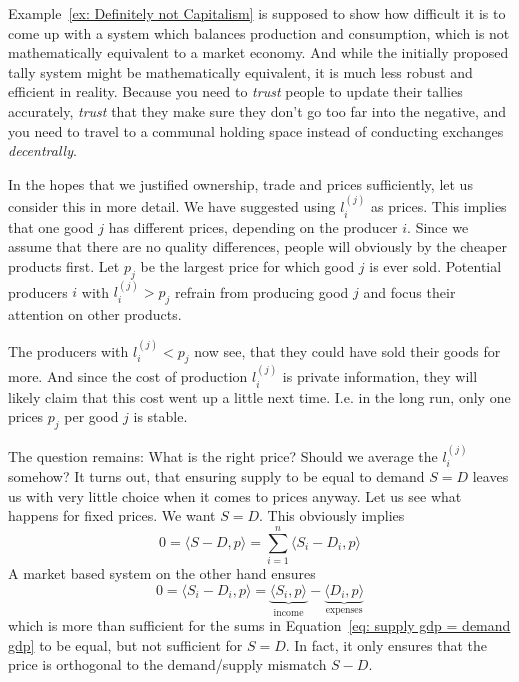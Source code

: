 \begin{remark}
	Example~\ref{ex: Definitely not Capitalism} is supposed to show how difficult
	it is to come up with a system which balances production and consumption,
	which is not mathematically equivalent to a market economy. And while the
	initially proposed tally system might be mathematically equivalent, it is
	much less robust and efficient in reality. Because you need to \emph{trust}
	people to update their tallies accurately, \emph{trust} that they make sure
	they don't go too far into the negative, and you need to travel to a
	communal holding space instead of conducting exchanges \emph{decentrally}.
\end{remark}

In the hopes that we justified ownership, trade and prices sufficiently, let us
consider this in more detail. We have suggested using \(l^{(j)}_i\) as prices.
This implies that one good \(j\) has different prices, depending on the producer
\(i\). Since we assume that there are no quality differences, people will
obviously by the cheaper products first. Let \(p_j\) be the largest price for
which good \(j\) is ever sold. Potential producers \(i\) with \(l^{(j)}_i > p_j\)
refrain from producing good \(j\) and focus their attention on other products.

The producers with \(l^{(j)}_i < p_j\) now see, that they could have sold their
goods for more. And since the cost of production \(l^{(j)}_i\) is private
information, they will likely claim that this cost went up a little next time.
I.e. in the long run, only one prices \(p_j\) per good \(j\) is stable.

The question remains: What is the right price? Should we average the
\(l^{(j)}_i\) somehow? It turns out, that ensuring supply to be equal to demand
\(S=D\) leaves us with very little choice when it comes to prices anyway.
Let us see what happens for fixed prices. We want \(S=D\). This obviously
implies
\begin{equation}
	\label{eq: supply gdp = demand gdp}
	0 =\langle S-D,p\rangle =  \sum_{i=1}^n \langle S_i - D_i, p\rangle
\end{equation}
A market based system on the other hand ensures
\[
	0 = \langle S_i - D_i, p\rangle
	= \underbrace{\langle S_i, p\rangle}_{\text{income}}
	- \underbrace{\langle D_i,p\rangle}_{\text{expenses}}
\]
which is more than sufficient for the sums in Equation~\eqref{eq: supply gdp =
demand gdp} to be equal, but not sufficient for \(S=D\). In fact, it only
ensures that the price is orthogonal to the demand/supply mismatch \(S-D\).


